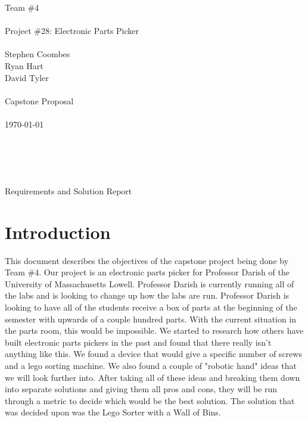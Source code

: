 \documentclass[12pt]{report}
\begin{document}

\noindent Team \#4 \\  \\
Project \#28: Electronic Parts Picker \\ \\
Stephen Coombes \\
Ryan Hart \\
David Tyler \\ \\
Capstone Proposal \\ \\
\today \\ \\ \\ \\ \\
\centerline{Requirements and Solution Report}
\newpage


\section*{Introduction}

This document describes the objectives of the capstone project being done by Team \#4. Our project is an electronic parts picker for Professor Darish of the University of Massachusetts Lowell. Professor Darish is currently running all of the labs and is looking to change up how the labs are run. Professor Darish is looking to have all of the students receive a box of parts at the beginning of the semester with upwards of a couple hundred parts. With the current situation in the parts room, this would be impossible. We started to research how others have built electronic parts pickers in the past and found that there really isn't anything like this. We found a device that would give a specific number of screws and a lego sorting machine. We also found a couple of "robotic hand" ideas that we will look further into. After taking all of these ideas and breaking them down into separate solutions and giving them all pros and cons, they will be run through a metric to decide which would be the best solution. The solution that was decided upon was the Lego Sorter with a Wall of Bins.
\end{document}
